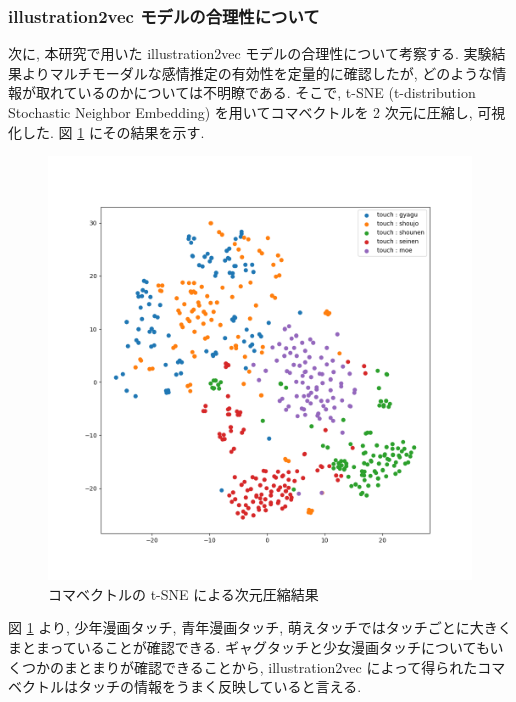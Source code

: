 \newpage
\changeindent{0cm}
\subsubsection{illustration2vec モデルの合理性について}
\changeindent{2cm}

次に, 本研究で用いた illustration2vec モデルの合理性について考察する. 実験結果よりマルチモーダルな感情推定の有効性を定量的に確認したが, どのような情報が取れているのかについては不明瞭である. そこで, t-SNE (t-distribution Stochastic Neighbor Embedding) \cite{vanDerMaaten2008} を用いてコマベクトルを 2 次元に圧縮し, 可視化した. 図 \ref{fig:koma_tsne} にその結果を示す.

\begin{figure}[!h]
  \vspace{10mm}
  \centering
  \includegraphics[width=0.9\hsize]{doc/figures/koma_tsne.png}
  \caption{コマベクトルの t-SNE による次元圧縮結果}
  \label{fig:koma_tsne}
\end{figure}

\newpage
図 \ref{fig:koma_tsne} より, 少年漫画タッチ, 青年漫画タッチ, 萌えタッチではタッチごとに大きくまとまっていることが確認できる. ギャグタッチと少女漫画タッチについてもいくつかのまとまりが確認できることから, illustration2vec によって得られたコマベクトルはタッチの情報をうまく反映していると言える.

